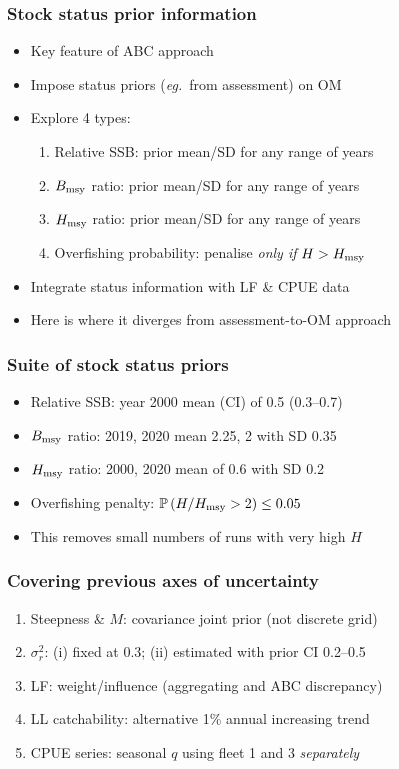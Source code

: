 \documentclass{beamer}
\newcommand{\sigr}{\sigma^2_r}
\newcommand{\bmsy}{B_{\rm msy}}
\newcommand{\hmsy}{H_{\rm msy}}
\newcommand{\eg}{\textit{eg.}~}
\begin{document}
\begin{frame}
\frametitle{Stock status prior information}
\begin{itemize}
    \item Key feature of ABC approach
    \item Impose status priors (\eg from assessment) on OM
    \item Explore 4 types:
        \vspace{0.25cm}
        \begin{enumerate}
            \item Relative SSB: prior mean/SD for any range of years
            \item $\bmsy$ ratio: prior mean/SD for any range of years
            \item $\hmsy$ ratio: prior mean/SD for any range of years
            \item Overfishing probability: penalise \emph{only if} $H>\hmsy$
        \end{enumerate}
        \vspace{0.25cm}
    \item Integrate status information with LF \& CPUE data
    \item Here is where it diverges from assessment-to-OM approach
\end{itemize}
\end{frame}
\begin{frame}
\frametitle{Suite of stock status priors}
\begin{itemize}
    \item Relative SSB: year 2000 mean (CI) of 0.5 (0.3--0.7)
    \item $\bmsy$ ratio: 2019, 2020 mean 2.25, 2 with SD 0.35
    \item $\hmsy$ ratio: 2000, 2020 mean of 0.6 with SD 0.2
    \item Overfishing penalty: $\mathbb{P}\left(H/\hmsy>2\right)\leq 0.05$ 
    \item This removes small numbers of runs with very high $H$
\end{itemize}
\end{frame}
\begin{frame}
\frametitle{Covering previous axes of uncertainty}
\begin{enumerate}
    \item Steepness \& $M$: covariance joint prior (not discrete grid)
    \item $\sigr$: (i) fixed at 0.3; (ii) estimated with prior CI 0.2--0.5  
    \item LF: weight/influence (aggregating and ABC discrepancy) 
    \item LL catchability: alternative 1\% annual increasing trend
    \item CPUE series: seasonal $q$ using fleet 1 and 3 \emph{separately}
\end{enumerate}
\end{frame}
\end{document}
